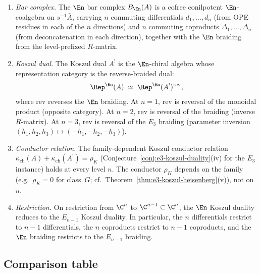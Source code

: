\begin{enumerate}[label=(\roman*)]
 \item \emph{Bar complex.} The $\En$ bar complex $B_{\En}(A)$ is a cofree conilpotent $\En$-coalgebra on $s^{-1}\bar{A}$, carrying $n$ commuting differentials $d_1, \ldots, d_n$ (from OPE residues in each of the $n$ directions) and $n$ commuting coproducts $\Delta_1, \ldots, \Delta_n$ (from deconcatenation in each direction), together with the $\En$ braiding from the level-prefixed $R$-matrix.
 \item \emph{Koszul dual.} The Koszul dual $A^!$ is the $\En$-chiral algebra whose representation category is the reverse-braided dual:
 \[
 \Rep^{\En}(A) \;\simeq\; \Rep^{\En}(A^!)^{\mathrm{rev}},
 \]
 where $\mathrm{rev}$ reverses the $\En$ braiding. At $n = 1$, $\mathrm{rev}$ is reversal of the monoidal product (opposite category). At $n = 2$, $\mathrm{rev}$ is reversal of the braiding (inverse $R$-matrix). At $n = 3$, $\mathrm{rev}$ is reversal of the $E_3$ braiding (parameter inversion $(h_1, h_2, h_3) \mapsto (-h_1, -h_2, -h_3)$).
 \item \emph{Conductor relation.} The family-dependent Koszul conductor relation $\kappa_{\mathrm{ch}}(A) + \kappa_{\mathrm{ch}}(A^!) = \rho_K$ (Conjecture~\ref{conj:e3-koszul-duality}(iv) for the $E_3$ instance) holds at every level $n$. The conductor $\rho_K$ depends on the family (e.g.\ $\rho_K = 0$ for class~$G$; cf.\ Theorem~\ref{thm:e3-koszul-heisenberg}(v)), not on $n$.
 \item \emph{Restriction.} On restriction from $\C^n$ to $\C^{n-1} \subset \C^n$, the $\En$ Koszul duality reduces to the $E_{n-1}$ Koszul duality. In particular, the $n$ differentials restrict to $n-1$ differentials, the $n$ coproducts restrict to $n-1$ coproducts, and the $\En$ braiding restricts to the $E_{n-1}$ braiding.
\end{enumerate}

\subsection{Comparison table}
\label{subsec:cascade-comparison}

